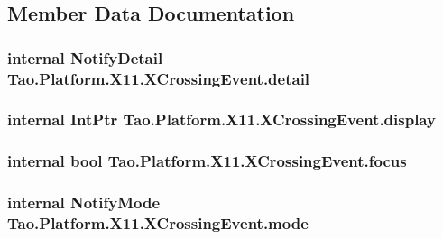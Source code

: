 \subsection{Member Data Documentation}
\hypertarget{struct_tao_1_1_platform_1_1_x11_1_1_x_crossing_event_a5b2029efb27940d80d74ec51bbe05bf3}{
\subsubsection[{detail}]{\setlength{\rightskip}{0pt plus 5cm}internal {\bf NotifyDetail} {\bf Tao.Platform.X11.XCrossingEvent.detail}}}
\label{struct_tao_1_1_platform_1_1_x11_1_1_x_crossing_event_a5b2029efb27940d80d74ec51bbe05bf3}
\hypertarget{struct_tao_1_1_platform_1_1_x11_1_1_x_crossing_event_aada99d32f5da118d139f04da259995b5}{
\subsubsection[{display}]{\setlength{\rightskip}{0pt plus 5cm}internal IntPtr {\bf Tao.Platform.X11.XCrossingEvent.display}}}
\label{struct_tao_1_1_platform_1_1_x11_1_1_x_crossing_event_aada99d32f5da118d139f04da259995b5}
\hypertarget{struct_tao_1_1_platform_1_1_x11_1_1_x_crossing_event_a8b571db3de3b48c12960af910b8dbf97}{
\subsubsection[{focus}]{\setlength{\rightskip}{0pt plus 5cm}internal bool {\bf Tao.Platform.X11.XCrossingEvent.focus}}}
\label{struct_tao_1_1_platform_1_1_x11_1_1_x_crossing_event_a8b571db3de3b48c12960af910b8dbf97}
\hypertarget{struct_tao_1_1_platform_1_1_x11_1_1_x_crossing_event_aa4f4def24fe5857086404237508fbaf3}{
\subsubsection[{mode}]{\setlength{\rightskip}{0pt plus 5cm}internal {\bf NotifyMode} {\bf Tao.Platform.X11.XCrossingEvent.mode}}}
